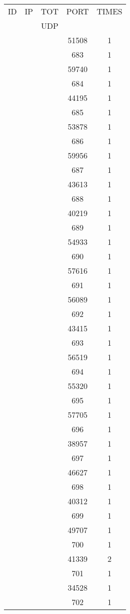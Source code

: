 \documentclass[a4paper]{scrartcl}
\begin{document}
\begin{minipage}[b]{0.5\linewidth}
\begin{tabular}{| c | c | c | c | c |}
\hline
ID & IP & TOT & PORT & TIMES \\ 
   &    & UDP &      &       \\ 
\hline
& & & 51508 & 1 \\ & & & 683 & 1 \\ & & & 59740 & 1 \\ & & & 684 & 1 \\ & & & 44195 & 1 \\ & & & 685 & 1 \\ & & & 53878 & 1 \\ & & & 686 & 1 \\ & & & 59956 & 1 \\ & & & 687 & 1 \\ & & & 43613 & 1 \\ & & & 688 & 1 \\ & & & 40219 & 1 \\ & & & 689 & 1 \\ & & & 54933 & 1 \\ & & & 690 & 1 \\ & & & 57616 & 1 \\ & & & 691 & 1 \\ & & & 56089 & 1 \\ & & & 692 & 1 \\ & & & 43415 & 1 \\ & & & 693 & 1 \\ & & & 56519 & 1 \\ & & & 694 & 1 \\ & & & 55320 & 1 \\ & & & 695 & 1 \\ & & & 57705 & 1 \\ & & & 696 & 1 \\ & & & 38957 & 1 \\ & & & 697 & 1 \\ & & & 46627 & 1 \\ & & & 698 & 1 \\ & & & 40312 & 1 \\ & & & 699 & 1 \\ & & & 49707 & 1 \\ & & & 700 & 1 \\ & & & 41339 & 2 \\ & & & 701 & 1 \\ & & & 34528 & 1 \\ & & & 702 & 1 \\ \hline\end{tabular}\end{minipage} \hfill\begin{minipage}[b]{0.5\linewidth}\begin{tabular}{| c | c | c | c | c |}

\end{tabular}
\end{minipage}
\end{document}
